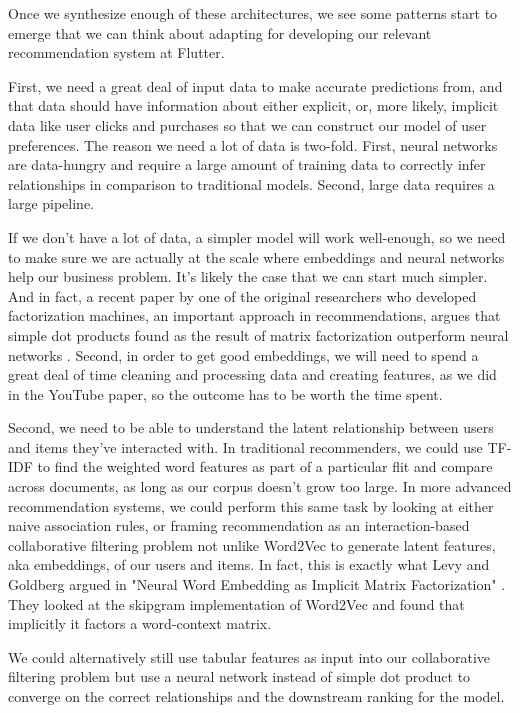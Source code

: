 \documentclass[11pt, table]{diazessay} %
\begin{document}
\begin{sloppypar}
Once we synthesize enough of these architectures, we see some patterns start to emerge that we can think about adapting for developing our relevant recommendation system at Flutter.

First, we need a great deal of input data to make accurate predictions from, and that data should have information about either explicit, or, more likely, implicit data like user clicks and purchases so that we can construct our model of user preferences. The reason we need a lot of data is two-fold. First, neural networks are data-hungry and require a large amount of training data to correctly infer relationships in comparison to traditional models. Second, large data requires a large pipeline.  

If we don't have a lot of data, a simpler model will work well-enough, so we need to make sure we are actually at the scale where embeddings and neural networks help our business problem. It's likely the case that we can start much simpler. And in fact, a recent paper by one of the original researchers who developed factorization machines, an important approach in recommendations, argues that simple dot products found as the result of matrix factorization outperform neural networks \citep{rendle2020neural}.  Second, in order to get good embeddings, we will need to spend a great deal of time cleaning and processing data and creating features, as we did in the YouTube paper, so the outcome has to be worth the time spent.

Second, we need to be able to understand the latent relationship between users and items they've interacted with. In traditional recommenders, we could use TF-IDF to find the weighted word features as part of a particular flit and compare across documents, as long as our corpus doesn't grow too large. In more advanced recommendation systems, we could perform this same task by looking at either naive association rules, or framing recommendation as an interaction-based collaborative filtering problem not unlike Word2Vec to generate latent features, aka embeddings, of our users and items. In fact, this is exactly what Levy and Goldberg argued in "Neural Word Embedding as Implicit Matrix Factorization"  \citep{levy2014neural}. They looked at the skipgram implementation of Word2Vec and found that implicitly it factors a word-context matrix.

We could alternatively still use tabular features as input into our collaborative filtering problem but use a neural network \citep{he2017neural} instead of simple dot product to converge on the correct relationships and the downstream ranking for the model.


\end{sloppypar}
\end{document}
